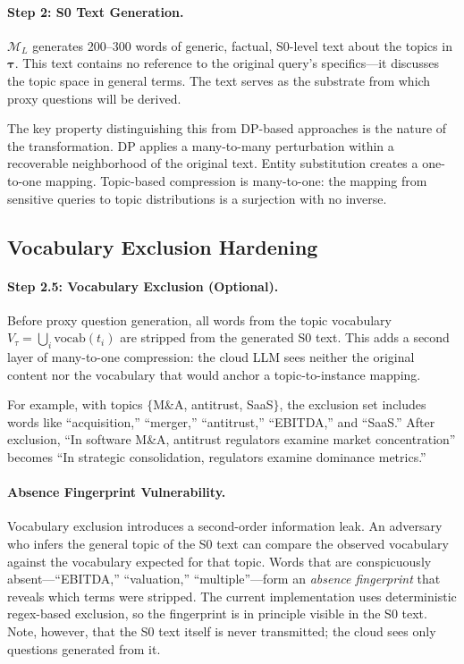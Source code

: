 \documentclass[sigconf,balance=false]{acmart}
\begin{document}
\paragraph{Step 2: S0 Text Generation.} $\mathcal{M}_L$ generates 200--300 words of generic, factual, S0-level text about the topics in $\boldsymbol{\tau}$. This text contains no reference to the original query's specifics---it discusses the topic space in general terms. The text serves as the substrate from which proxy questions will be derived.

The key property distinguishing this from DP-based approaches is the nature of the transformation. DP applies a many-to-many perturbation within a recoverable neighborhood of the original text. Entity substitution creates a one-to-one mapping. Topic-based compression is many-to-one: the mapping from sensitive queries to topic distributions is a surjection with no inverse.

\subsection{Vocabulary Exclusion Hardening}
\label{sec:vocab-exclusion}

\paragraph{Step 2.5: Vocabulary Exclusion (Optional).} Before proxy question generation, all words from the topic vocabulary $V_\tau = \bigcup_i \text{vocab}(t_i)$ are stripped from the generated S0 text. This adds a second layer of many-to-one compression: the cloud LLM sees neither the original content nor the vocabulary that would anchor a topic-to-instance mapping.

For example, with topics $\{$M\&A, antitrust, SaaS$\}$, the exclusion set includes words like ``acquisition,'' ``merger,'' ``antitrust,'' ``EBITDA,'' and ``SaaS.'' After exclusion, ``In software M\&A, antitrust regulators examine market concentration'' becomes ``In strategic consolidation, regulators examine dominance metrics.''

\paragraph{Absence Fingerprint Vulnerability.} Vocabulary exclusion introduces a second-order information leak. An adversary who infers the general topic of the S0 text can compare the observed vocabulary against the vocabulary expected for that topic. Words that are conspicuously absent---``EBITDA,'' ``valuation,'' ``multiple''---form an \emph{absence fingerprint} that reveals which terms were stripped. The current implementation uses deterministic regex-based exclusion, so the fingerprint is in principle visible in the S0 text. Note, however, that the S0 text itself is never transmitted; the cloud sees only questions generated from it.
\end{document}
